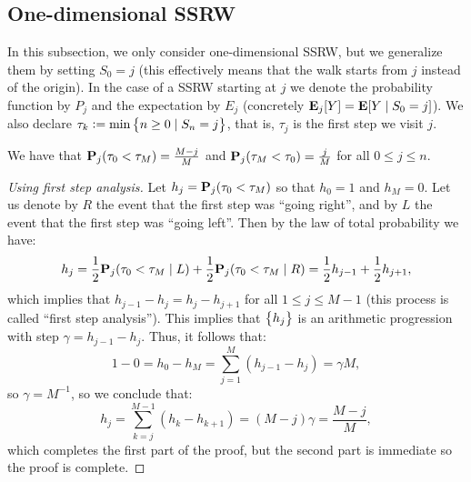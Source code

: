 \documentclass[11pt,a4paper]{article}
\begin{document}
\subsection{One-dimensional SSRW}
In this subsection, we only consider one-dimensional SSRW,
but we generalize them by setting $S_0 = j$
(this effectively means that the walk starts from $j$ instead of the origin).
In the case of a SSRW starting at $j$ we denote the probability function
by $P_j$ and the expectation by $E_j$
(concretely $\mathbf{E}_j[Y] = \mathbf{E}[Y \mid S_0 = j]$).
We also declare $\tau_k := \min\left\{n \geq 0 \mid S_n = j\right\}$,
that is, $\tau_j$ is the first step we visit $j$.

\begin{proposition}
  We have that $\mathbf{P}_j(\tau_0 < \tau_M) = \frac{M - j}{M}$
  and $\mathbf{P}_j(\tau_M < \tau_0) = \frac{j}{M}$
  for all $0 \le j \le n$.
\end{proposition}
\begin{proof}[Using first step analysis]
  Let $h_j = \mathbf{P}_j(\tau_0 < \tau_M)$
  so that $h_0 = 1$ and $h_M = 0$.
  Let us denote by $R$ the event that the first step was ``going right'',
  and by $L$ the event that the first step was ``going left''.
  Then by the law of total probability we have:
  \[
    h_j =
    \frac{1}{2} \mathbf{P}_j(\tau_0 < \tau_M \mid L) +
      \frac{1}{2} \mathbf{P}_j(\tau_0 < \tau_M \mid R) =
    \frac{1}{2} h_{j-1} + \frac{1}{2} h_{j+1},
  \]
  which implies that $h_{j-1} - h_j = h_j - h_{j+1}$
  for all $1 \le j \le M - 1$ (this process is called ``first step analysis'').
  This implies that $\left\{h_j\right\}$
  is an arithmetic progression with step $\gamma = h_{j-1} - h_j$.
  Thus, it follows that:
  \[
    1 - 0 =
    h_0 - h_M =
    \sum_{j=1}^{M} (h_{j-1} - h_j) = \gamma M,
  \]
  so $\gamma = M^{-1}$, so we conclude that:
  \[
    h_j = \sum_{k=j}^{M-1} (h_k - h_{k+1}) =
    (M - j) \gamma =
    \frac{M - j}{M},
  \]
  which completes the first part of the proof,
  but the second part is immediate so the proof is complete.
\end{proof}
\end{document}
